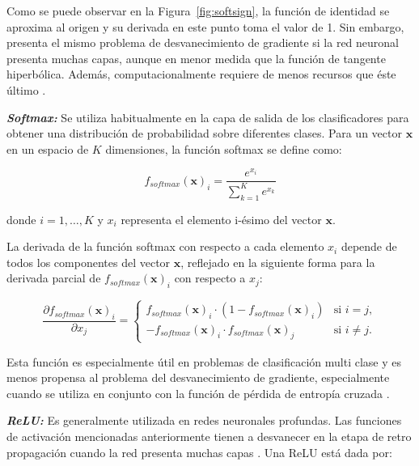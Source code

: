 Como se puede observar en la Figura~\ref{fig:softsign}, la función de identidad se aproxima al origen y su derivada en este punto toma el valor de 1. Sin embargo, presenta el mismo problema de desvanecimiento de gradiente si la red neuronal presenta muchas capas, aunque en menor medida que la función de tangente hiperbólica. Además, computacionalmente requiere de menos recursos que éste último \cite{aghdam2017guide}.

\textbf{\textit{Softmax:}} Se utiliza habitualmente en la capa de salida de los clasificadores para obtener una distribución de probabilidad sobre diferentes clases. Para un vector \( \mathbf{x} \) en un espacio de \( K \) dimensiones, la función softmax se define como:

\begin{equation}
    f_{softmax}(\mathbf{x})_i = \frac{e^{x_i}}{\sum_{k=1}^{K} e^{x_k}}
\end{equation}

donde \( i = 1, \ldots, K \) y \( x_i \) representa el elemento i-ésimo del vector \( \mathbf{x} \).

La derivada de la función softmax con respecto a cada elemento \( x_i \) depende de todos los componentes del vector \( \mathbf{x} \), reflejado en la siguiente forma para la derivada parcial de \( f_{softmax}(\mathbf{x})_i \) con respecto a \( x_j \):

\begin{equation}
    \frac{\partial f_{softmax}(\mathbf{x})_i}{\partial x_j} =
    \begin{cases}
        f_{softmax}(\mathbf{x})_i \cdot (1 - f_{softmax}(\mathbf{x})_i) & \text{si } i = j,    \\
        -f_{softmax}(\mathbf{x})_i \cdot f_{softmax}(\mathbf{x})_j      & \text{si } i \neq j.
    \end{cases}
\end{equation}

Esta función es especialmente útil en problemas de clasificación multi clase y es menos propensa al problema del desvanecimiento de gradiente, especialmente cuando se utiliza en conjunto con la función de pérdida de entropía cruzada \cite{goodfellow2016deep}.

\textbf{\textit{ReLU:}} Es generalmente utilizada en redes neuronales profundas. Las funciones de activación mencionadas anteriormente tienen a desvanecer en la etapa de retro propagación cuando la red presenta muchas capas \cite{aghdam2017guide}. Una ReLU está dada por:

